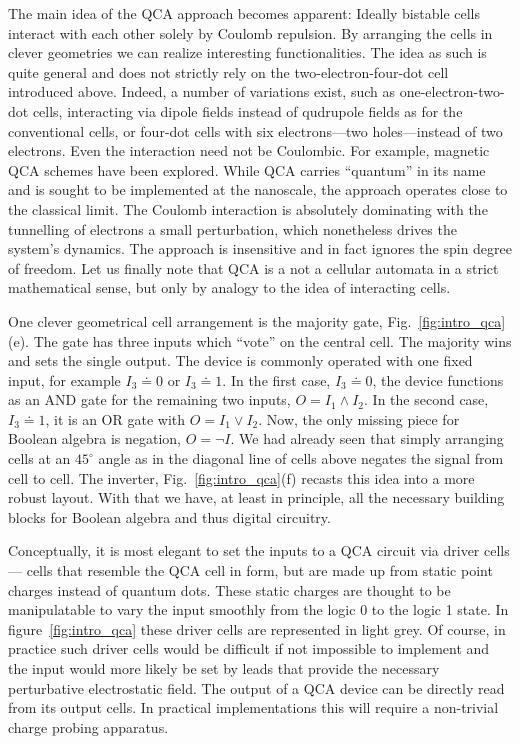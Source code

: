 The main idea of the QCA approach becomes apparent: Ideally bistable cells
interact with each other solely by Coulomb repulsion. By arranging the cells in
clever geometries we can realize interesting functionalities. The idea as such
is quite general and does not strictly rely on the two-electron-four-dot cell
introduced above. Indeed, a number of variations exist, such as
one-electron-two-dot cells, interacting via dipole fields instead of qudrupole
fields as for the conventional cells, or four-dot cells with six electrons---two
holes---instead of two electrons. Even the interaction need not be Coulombic.
For example, magnetic QCA schemes have been explored. While QCA carries
``quantum'' in its name and is sought to be implemented at the nanoscale, the
approach operates close to the classical limit. The Coulomb interaction is
absolutely dominating with the tunnelling of electrons a small perturbation,
which nonetheless drives the system's dynamics. The approach is insensitive and
in fact ignores the spin degree of freedom. Let us finally note that QCA is a
not a cellular automata in a strict mathematical sense, but only by analogy to
the idea of interacting cells.

One clever geometrical cell arrangement is the majority gate,
Fig.~\ref{fig:intro_qca}(e). The gate has three inputs which ``vote'' on the
central cell. The majority wins and sets the single output. The device is
commonly operated with one fixed input, for example $I_3 \doteq 0$ or $I_3
\doteq 1$. In the first case, $I_3 \doteq 0$, the device functions as an AND
gate for the remaining two inputs, $O = I_1 \land I_2$. In the second case, $I_3
\doteq 1$, it is an OR gate with $O = I_1 \lor I_2$. Now, the only missing piece
for Boolean algebra is negation, $O = \lnot I$. We had already seen that simply
arranging cells at an $45^{\circ}$ angle as in the diagonal line of cells above
negates the signal from cell to cell. The inverter, Fig.~\ref{fig:intro_qca}(f)
recasts this idea into a more robust layout. With that we have, at least in
principle, all the necessary building blocks for Boolean algebra and thus
digital circuitry.

Conceptually, it is most elegant to set the inputs to a QCA circuit via driver
cells --- cells that resemble the QCA cell in form, but are made up from static
point charges instead of quantum dots. These static charges are thought to be
manipulatable to vary the input smoothly from the logic 0 to the logic 1 state.
In figure~\ref{fig:intro_qca} these driver cells are represented in light grey.
Of course, in practice such driver cells would be difficult if not impossible to
implement and the input would more likely be set by leads that provide the
necessary perturbative electrostatic field. The output of a QCA device can be
directly read from its output cells. In practical implementations this will
require a non-trivial charge probing apparatus.

